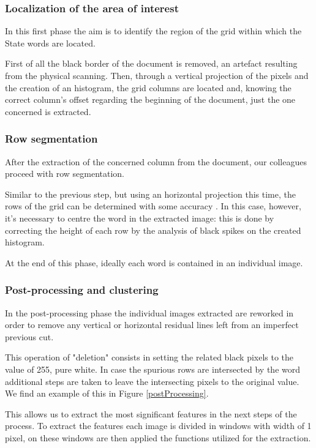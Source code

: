 \subsubsection{Localization of the area of interest}

In this first phase the aim is to identify the region of the grid within which the State words are located. 

First of all the black border of the document is removed, an artefact resulting from the physical scanning. Then, through a vertical projection of the pixels and the creation of an histogram, the grid columns are located and, knowing the correct column's offset regarding the beginning of the document, just the one concerned is extracted.

\subsubsection{Row segmentation}

After the extraction of the concerned column from the document, our colleagues proceed with row segmentation.

Similar to the previous step, but using an horizontal projection this time, the rows of the grid can be determined with some accuracy . In this case, however, it's necessary to centre the word in the extracted image: this is done by correcting the height of each row by the analysis of black spikes on the created histogram.

At the end of this phase, ideally each word is contained in an individual image.

\subsubsection{Post-processing and clustering}
\label{oldFeatures}
In the post-processing phase the individual images extracted are reworked in order to remove any  vertical or horizontal residual lines left from an imperfect previous cut.

This operation of "deletion" consists in setting the related black pixels to the value of 255, pure white.
In case the spurious rows are intersected by the word additional steps are taken to leave the intersecting pixels to the original value. We find an example of this in Figure \ref{postProcessing}.

This allows us to extract the most significant features in the next steps of the process.
To extract the features each image is divided in windows with width of 1 pixel, on these windows are then applied the functions utilized for the extraction.

